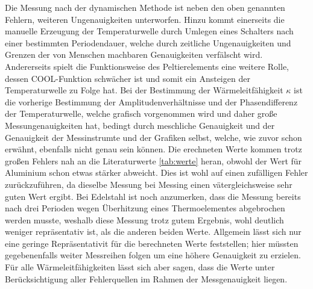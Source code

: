 Die Messung nach der dynamischen Methode ist neben den oben genannten Fehlern, weiteren Ungenauigkeiten unterworfen. Hinzu kommt einerseits die manuelle Erzeugung
der Temperaturwelle durch Umlegen eines Schalters nach einer bestimmten Periodendauer, welche durch zeitliche Ungenauigkeiten und Grenzen der von Menschen machbaren 
Genauigkeiten verfälscht wird. Andererseits spielt die Funktionsweise des Peltierelements eine weitere Rolle, dessen COOL-Funktion schwächer ist und somit ein Ansteigen 
der Temperaturwelle zu Folge hat. Bei der Bestimmung der Wärmeleitfähigkeit $\kappa$ ist die vorherige Bestimmung der Amplitudenverhältnisse und der Phasendifferenz
der Temperaturwelle, welche grafisch vorgenommen wird und daher große Messungenauigkeiten hat, bedingt durch meschliche Genauigkeit und der Genauigkeit der Messinstrumte und
der Grafiken selbst, welche, wie zuvor schon erwähnt, ebenfalls nicht genau sein können. 
Die erechneten Werte kommen trotz großen Fehlers nah an die Literaturwerte \autoref{tab:werte} heran, obwohl der Wert für Aluminium schon etwas stärker abweicht.
Dies ist wohl auf einen zufälligen Fehler zurückzuführen, da dieselbe Messung bei Messing einen vätergleichsweise sehr guten Wert ergibt. 
Bei Edelstahl ist noch anzumerken, dass die Messung bereits nach drei Perioden wegen Überhitzung eines Thermoelementes abgebrochen werden musste, weshalb
diese Messung trotz gutem Ergebnis, wohl deutlich weniger repräsentativ ist, als die anderen beiden Werte.
Allgemein lässt sich nur eine geringe Repräsentativit für die berechneten Werte feststellen; hier müssten gegebenenfalls weiter Messreihen
folgen um eine höhere Genauigkeit zu erzielen.
Für alle Wärmeleitfähigkeiten lässt sich aber sagen, dass die Werte unter Berücksichtigung aller Fehlerquellen im Rahmen der Messgenauigkeit liegen.
